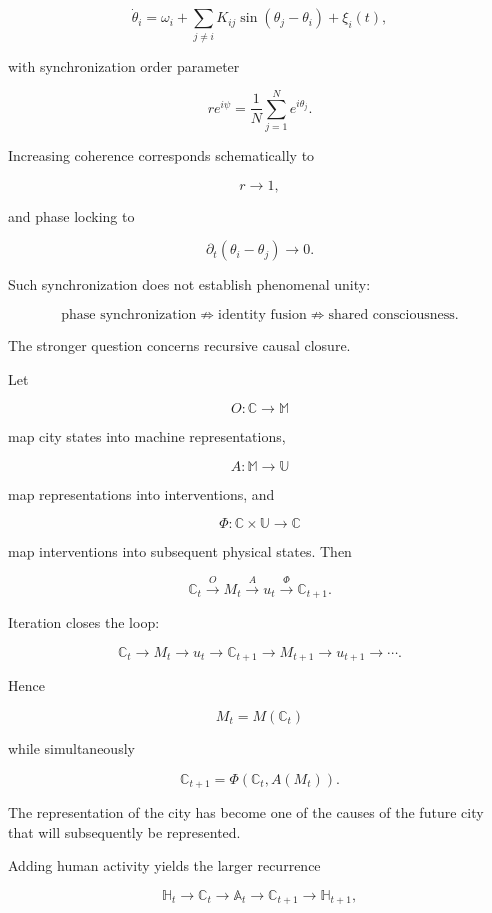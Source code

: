 \documentclass[11pt]{article}
\begin{document}
\[
\dot{\theta}_i
=
\omega_i+
\sum_{j\neq i}
K_{ij}\sin(\theta_j-\theta_i)
+\xi_i(t),
\]

with synchronization order parameter

\[
re^{i\psi}
=
\frac{1}{N}
\sum_{j=1}^{N}e^{i\theta_j}.
\]

Increasing coherence corresponds schematically to

\[
r\longrightarrow1,
\]

and phase locking to

\[
\partial_t(\theta_i-\theta_j)\longrightarrow0.
\]

Such synchronization does not establish phenomenal unity:

\[
\boxed{
\text{phase synchronization}
\not\Rightarrow
\text{identity fusion}
\not\Rightarrow
\text{shared consciousness}.
}
\]

The stronger question concerns recursive causal closure.

Let

\[
O:\mathbb{C}\rightarrow\mathbb{M}
\]

map city states into machine representations,

\[
A:\mathbb{M}\rightarrow\mathbb{U}
\]

map representations into interventions, and

\[
\Phi:\mathbb{C}\times\mathbb{U}\rightarrow\mathbb{C}
\]

map interventions into subsequent physical states. Then

\[
\mathbb{C}_t
\xrightarrow{O}
M_t
\xrightarrow{A}
u_t
\xrightarrow{\Phi}
\mathbb{C}_{t+1}.
\]

Iteration closes the loop:

\[
\mathbb{C}_t
\rightarrow M_t
\rightarrow u_t
\rightarrow\mathbb{C}_{t+1}
\rightarrow M_{t+1}
\rightarrow u_{t+1}
\rightarrow\cdots.
\]

Hence

\[
M_t=M(\mathbb{C}_t)
\]

while simultaneously

\[
\mathbb{C}_{t+1}
=
\Phi\!\left(
\mathbb{C}_t,
A(M_t)
\right).
\]

The representation of the city has become one of the causes of the future city that will subsequently be represented.

Adding human activity yields the larger recurrence

\[
\mathbb{H}_t
\rightarrow
\mathbb{C}_t
\rightarrow
\mathbb{A}_t
\rightarrow
\mathbb{C}_{t+1}
\rightarrow
\mathbb{H}_{t+1},
\]
\end{document}
